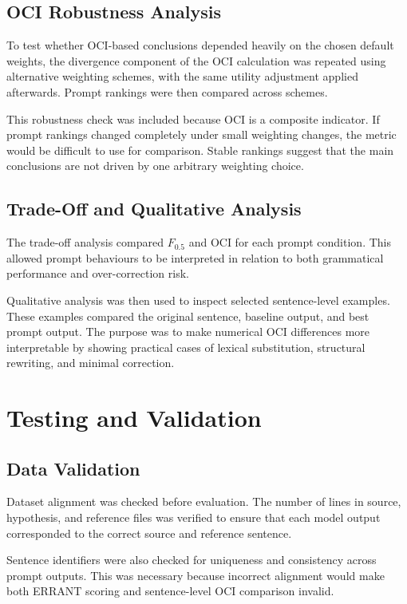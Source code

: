 \subsection{OCI Robustness Analysis}

To test whether OCI-based conclusions depended heavily on the chosen default weights, the divergence component of the OCI calculation was repeated using alternative weighting schemes, with the same utility adjustment applied afterwards. Prompt rankings were then compared across schemes.

This robustness check was included because OCI is a composite indicator. If prompt rankings changed completely under small weighting changes, the metric would be difficult to use for comparison. Stable rankings suggest that the main conclusions are not driven by one arbitrary weighting choice.

\subsection{Trade-Off and Qualitative Analysis}

The trade-off analysis compared $F_{0.5}$ and OCI for each prompt condition. This allowed prompt behaviours to be interpreted in relation to both grammatical performance and over-correction risk.

Qualitative analysis was then used to inspect selected sentence-level examples. These examples compared the original sentence, baseline output, and best prompt output. The purpose was to make numerical OCI differences more interpretable by showing practical cases of lexical substitution, structural rewriting, and minimal correction.

\section{Testing and Validation}

\subsection{Data Validation}

Dataset alignment was checked before evaluation. The number of lines in source, hypothesis, and reference files was verified to ensure that each model output corresponded to the correct source and reference sentence.

Sentence identifiers were also checked for uniqueness and consistency across prompt outputs. This was necessary because incorrect alignment would make both ERRANT scoring and sentence-level OCI comparison invalid.

